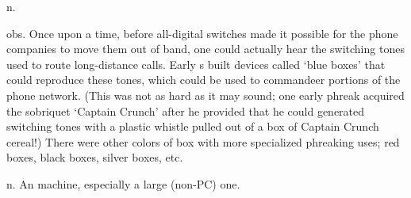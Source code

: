  n.

\begin{inparaenum}
\item obs. Once upon a time, before all-digital switches made it possible for
    the phone companies to move them out of band, one could actually hear the
    switching tones used to route long-distance calls. Early
    s built devices called `blue boxes' that could reproduce
    these tones, which could be used to commandeer portions of the phone
    network. (This was not as hard as it may sound; one early phreak acquired
    the sobriquet `Captain Crunch' after he provided that he could generated
    switching tones with a plastic whistle pulled out of a box of Captain Crunch
    cereal!) There were other colors of box with more specialized phreaking
    uses; red boxes, black boxes, silver boxes, etc.
\item n. An  machine, especially a large (non-PC) one.
\end{inparaenum}

